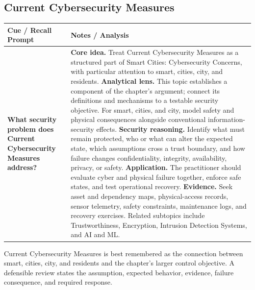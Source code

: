 \documentclass[11pt]{article}
\newcommand{\CornellHeader}{%
\rowcolor{Navy}\color{white}\bfseries Cue / Recall Prompt & \color{white}\bfseries Notes / Analysis\\\hline}
\newcommand{\CornellRow}[2]{%
\cellcolor{CueGray}\RaggedRight\textbf{#1} & \RaggedRight #2\\\hline}
\begin{document}
\subsection*{Current Cybersecurity Measures}
\begin{longtable}{>{\RaggedRight\arraybackslash}p{}|>{\RaggedRight\arraybackslash}p{}}
\CornellHeader
\CornellRow{What security problem does Current Cybersecurity Measures address?}{\textbf{Core idea.} Treat Current Cybersecurity Measures as a structured part of Smart Cities: Cybersecurity Concerns, with particular attention to smart, cities, city, and residents. \textbf{Analytical lens.} This topic establishes a component of the chapter's argument; connect its definitions and mechanisms to a testable security objective. For smart, cities, and city, model safety and physical consequences alongside conventional information-security effects. \textbf{Security reasoning.} Identify what must remain protected, who or what can alter the expected state, which assumptions cross a trust boundary, and how failure changes confidentiality, integrity, availability, privacy, or safety. \textbf{Application.} The practitioner should evaluate cyber and physical failure together, enforce safe states, and test operational recovery. \textbf{Evidence.} Seek asset and dependency maps, physical-access records, sensor telemetry, safety constraints, maintenance logs, and recovery exercises. Related subtopics include Trustworthiness, Encryption, Intrusion Detection Systems, and AI and ML.}
\end{longtable}
\begin{topicsummary}
Current Cybersecurity Measures is best remembered as the connection between smart, cities, city, and residents and the chapter's larger control objective. A defensible review states the assumption, expected behavior, evidence, failure consequence, and required response.
\end{topicsummary}
\end{document}
